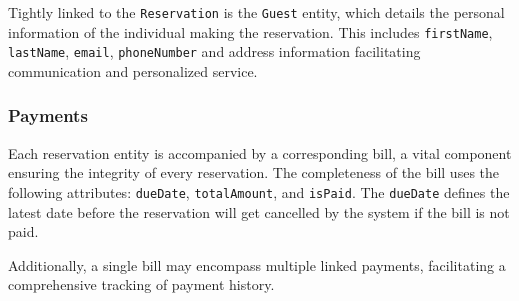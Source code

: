 Tightly linked to the \texttt{Reservation} is the \texttt{Guest} entity, which details the personal information of the individual making the reservation. This includes \texttt{firstName}, \texttt{lastName}, \texttt{email}, \texttt{phoneNumber} and address information facilitating communication and personalized service.

\subsubsection{Payments}

Each reservation entity is accompanied by a corresponding bill, a vital component ensuring the integrity of every reservation. The completeness of the bill uses the following attributes: \texttt{dueDate}, \texttt{totalAmount}, and \texttt{isPaid}. The \texttt{dueDate} defines the latest date before the reservation will get cancelled by the system if the bill is not paid.

Additionally, a single bill may encompass multiple linked payments, facilitating a comprehensive tracking of payment history.